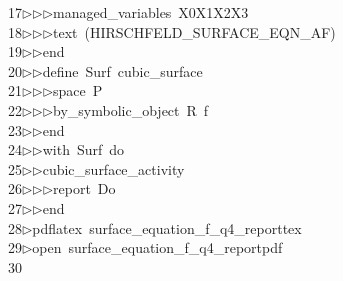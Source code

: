 \begin{tabbing}
17\>$\triangleright$\>$\triangleright$\>$\triangleright$\>managed\_variables\ X0X1X2X3\ \\[0pt]
18\>$\triangleright$\>$\triangleright$\>$\triangleright$\>text\ (HIRSCHFELD\_SURFACE\_EQN\_AF)\ \\[0pt]
19\>$\triangleright$\>$\triangleright$\>end\ \\[0pt]
20\>$\triangleright$\>$\triangleright$\>define\ Surf\ cubic\_surface\ \\[0pt]
21\>$\triangleright$\>$\triangleright$\>$\triangleright$\>space\ P\ \\[0pt]
22\>$\triangleright$\>$\triangleright$\>$\triangleright$\>by\_symbolic\_object\ R\ f\ \\[0pt]
23\>$\triangleright$\>$\triangleright$\>end\ \\[0pt]
24\>$\triangleright$\>$\triangleright$\>with\ Surf\ do\ \\[0pt]
25\>$\triangleright$\>$\triangleright$\>cubic\_surface\_activity\ \\[0pt]
26\>$\triangleright$\>$\triangleright$\>$\triangleright$\>report\ Do\ \\[0pt]
27\>$\triangleright$\>$\triangleright$\>end\\[0pt]
28\>$\triangleright$\>pdflatex\ surface\_equation\_f\_q4\_reporttex\\[0pt]
29\>$\triangleright$\>open\ surface\_equation\_f\_q4\_reportpdf\\[0pt]
30\>\end{tabbing}
